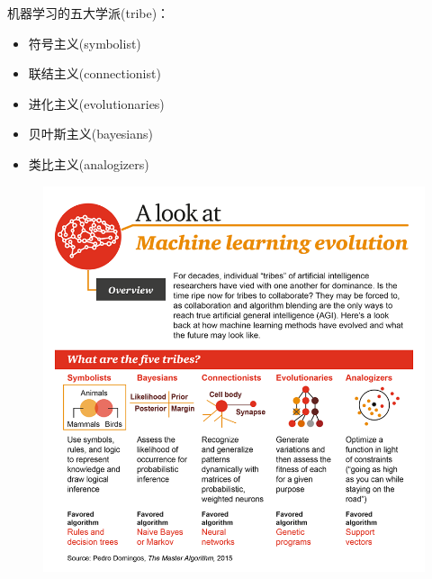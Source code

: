 机器学习的五大学派(tribe)：
\begin{itemize}
	\item 符号主义(symbolist)
	\item 联结主义(connectionist)
	\item 进化主义(evolutionaries)
	\item 贝叶斯主义(bayesians)
	\item 类比主义(analogizers)
\end{itemize}
\begin{figure}[H]
\centering
\includegraphics[width=0.8\linewidth]{fig/A-Look-at-Machine-Learning-Evolution.png}
\end{figure}
